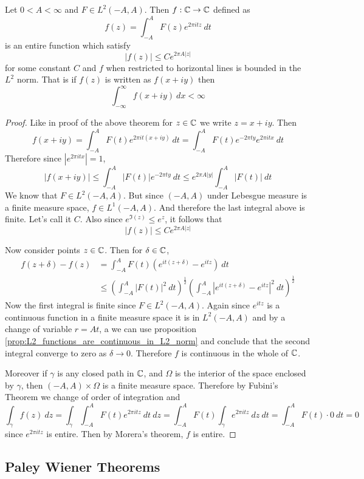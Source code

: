 \begin{proposition}
  Let $0<A<\infty$ and $F \in L^2(-A, A)$. Then $f:\mathbb C \to \mathbb C$ defined as $$f(z) = \int_{-A}^A F(z)e^{2\pi itz} \ dt$$
  is an entire function which satisfy $$|f(z)| \le Ce^{2 \pi A|z|}$$
  for some constant $C$ and $f$ when restricted to horizontal lines is bounded in the $L^2$ norm. That is if $f(z)$ is written as $f(x+iy)$ then  $$\int_{-\infty}^{\infty} f(x+iy) \ dx < \infty$$
\end{proposition}
\begin{proof}
  Like in proof of the above theorem for $z\in \mathbb C$ we write $z = x+iy$. Then $$f(x+iy) = \int_{-A}^A F(t) e^{2\pi it(x+iy)} \ dt = \int_{-A}^A F(t)e^{-2\pi ty}e^{2\pi itx} \ dt$$
  Therefore since $|e^{2\pi it x}| = 1$, $$\left|f(x+iy)\right| \le \int_{-A}^A \left|F(t)\right| e^{-2\pi ty} \ dt \le e^{2\pi A|y|} \int_{-A}^A \left|F(t)\right| \ dt $$
  We know that $F \in L^2(-A, A)$. But since $(-A, A)$ under Lebesgue measure is a finite measure space, $f \in L^1(-A, A)$. And therefore the last integral above is finite. Let's call it $C$. Also since $e^{\Im(z)} \le e^z$, it follows that $$\left|f(z) \right| \le Ce^{2\pi A |z|}$$

  Now consider points $z \in \mathbb C$. Then for $\delta \in \mathbb C$,
  \begin{align*}
    f(z+\delta) - f(z) &= \int_{-A}^A F(t)\left(e^{it(z+\delta)} - e^{itz}\right) \ dt \\
    &\le \left(\int_{-A}^A \left|F(t)\right|^2\ dt \right)^{\frac{1}{2}} \left(\int_{-A}^A \left|e^{it(z+\delta)}-e^{itz}\right|^2 \ dt \right)^{\frac{1}{2}}
  \end{align*}
  Now the first integral is finite since $F\in L^2(-A, A)$. Again since $e^{itz}$ is a continuous function in a finite measure space it is in $L^2(-A, A)$ and by a change of variable $r = At$, a we can use proposition \ref{prop:L2_functions_are_continuous_in_L2_norm} and conclude that the second integral converge to zero as $\delta \to 0$. Therefore $f$ is continuous in the whole of $\mathbb C$. 

  Moreover if $\gamma$ is any closed path in $\mathbb C$, and $\Omega$ is the interior of the space enclosed by $\gamma$, then $(-A, A)\times\Omega$ is a finite measure space. Therefore by Fubini's Theorem we change of order of integration and $$\int_\gamma f(z) \ dz = \int_\gamma \int_{-A}^A F(t)e^{2\pi itz} \ dt \ dz = \int_{-A}^A F(t) \int_\gamma e^{2\pi itz} \ dz \ dt = \int_{-A}^A F(t)\cdot 0 \ dt = 0$$
  since $e^{2\pi itz}$ is entire. Then by Morera's theorem, $f$ is entire.
\end{proof}

\subsection{Paley Wiener Theorems}

